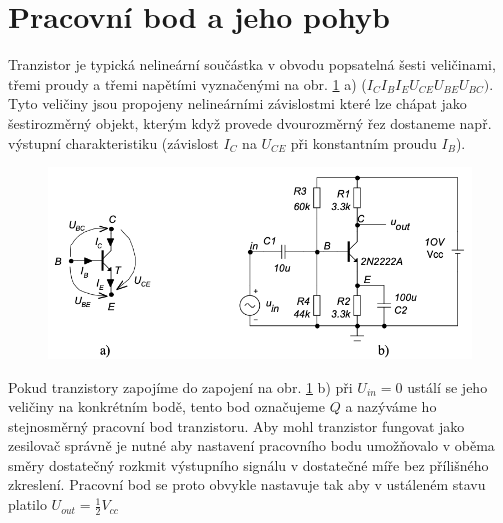 \documentclass{article}
\newcommand \obr[1]
{ obr. \ref{#1}}
\begin{document}
\section{Pracovní bod a jeho pohyb}

Tranzistor je typická nelineární součástka v obvodu popsatelná šesti veličinami, třemi proudy a třemi napětími vyznačenými na \obr{pracovni_bod_tranzistoru} a) (\(I_C I_B I_E U_{CE} U_{BE} U_{BC})\).
Tyto veličiny jsou propojeny nelineárními závislostmi které lze chápat jako šestirozměrný objekt, kterým když provede dvourozměrný řez dostaneme např. výstupní charakteristiku (závislost \(I_C\) na \(U_{CE}\)
při konstantním proudu \(I_B\)).
\vspace{-1mm}
\begin{figure}[H]
    \includegraphics[width=\textwidth]{pracovni_bod_tranzistoru.png}
    \caption{\label{pracovni_bod_tranzistoru}}
\end{figure}

Pokud tranzistory zapojíme do zapojení na \obr{pracovni_bod_tranzistoru} b) při \(U_{in} = 0\) ustálí se jeho veličiny na konkrétním bodě, tento bod označujeme \(Q\) a nazýváme ho stejnosměrný pracovní bod tranzistoru.
Aby mohl tranzistor fungovat jako zesilovač správně je nutné aby nastavení pracovního bodu umožňovalo v oběma směry dostatečný rozkmit výstupního signálu v dostatečné míře bez přílišného zkreslení.
Pracovní bod se proto obvykle nastavuje tak aby v ustáleném stavu platilo \(U_{out} = \frac{1}{2}V_{cc}\)
\end{document}
